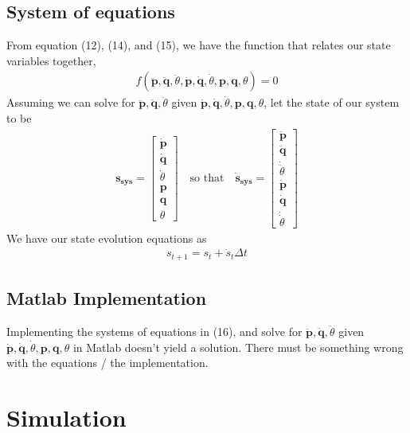 \subsection{System of equations}
From equation (12), (14), and (15), we have the function that relates our state variables together,
\begin{align}
  f(\bm{\ddot{p}},\bm{\ddot{q}}, \ddot{\theta}, \bm{\dot{p}},\bm{\dot{q}}, \dot{\theta},\bm{p},\bm{q}, \theta) = 0
\end{align}
Assuming we can solve for $\bm{\ddot{p}},\bm{\ddot{q}}, \ddot{\theta}$ given $\bm{\dot{p}},\bm{\dot{q}}, \dot{\theta},\bm{p},\bm{q}, \theta$, let the state of our system to be
\begin{align*}
  \bm{s_{sys}} =
  \begin{bmatrix}
      \bm{\dot{p}} \\
      \bm{\dot{q}} \\
      \dot{\theta} \\
      \bm{p} \\
      \bm{q} \\
      \theta
  \end{bmatrix}
  \quad \text{so that} \quad
  \bm{\dot{s}_{sys}} =
    \begin{bmatrix}
      \bm{\ddot{p}} \\
      \bm{\ddot{q}} \\
      \dot{\ddot\theta} \\
      \bm{\dot{p}} \\
      \bm{\dot{q}} \\
      \dot{\dot{\theta}}
  \end{bmatrix}
\end{align*}
We have our state evolution equations as
\begin{align}
  s_{t+1} = s_{t} + \dot{s}_{t}\Delta t
\end{align}

\subsection{Matlab Implementation}
Implementing the systems of equations in (16), and solve for $\bm{\ddot{p}},\bm{\ddot{q}}, \ddot{\theta}$ given $\bm{\dot{p}},\bm{\dot{q}}, \dot{\theta},\bm{p},\bm{q}, \theta$ in Matlab doesn't yield a solution. There must be something wrong with the equations / the implementation.
\section{Simulation}
